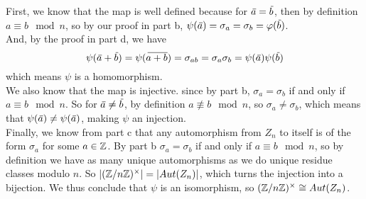 \documentclass[12pt]{article}
\begin{document}
\begin{enumerate}[label=\textbf{\alph*.}]
            First, we know that the map is well defined
            because for $\,\overline{\!{a}} = \,\overline{\!{b}}$,
            then by definition $a \equiv b \mod n$,
            so by our proof in part b,
            $\psi(\,\overline{\!{a}}) = \sigma_a = \sigma_b = \varphi(\,\overline{\!{b}})$. \\
            And, by the proof in part d, we have
            \[ \psi(\,\overline{\!{a}} + \,\overline{\!{b}})
            = \psi(\,\overline{\!{a + b}})
            = \sigma_{ab}
            = \sigma_{a}\sigma_{b} 
            = \psi(\,\overline{\!{a}})\psi(\,\overline{\!{b}}) \]
            which means $\psi$ is a homomorphism. \\
            We also know that the map is injective.
            since by part b, $\sigma_a = \sigma_b$
            if and only if $a \equiv b \mod n$.
            So for $\,\overline{\!{a}} \neq \,\overline{\!{b}}$,
            by definition $a \not\equiv b \mod n$,
            so $\sigma_a \neq \sigma_b$,
            which means that $\psi(\,\overline{\!{a}}) \neq \psi(\,\overline{\!{a}})$,
            making $\psi$ an injection. \\
            Finally, we know from part c that any automorphism
            from $Z_n$ to itself is of the form $\sigma_a$
            for some $a \in \mathbb{Z}$.
            By part b $\sigma_a = \sigma_b$
            if and only if $a \equiv b \mod n$,
            so by definition we have as many
            unique automorphisms as we do unique residue classes
            modulo $n$.
            So $|(\mathbb{Z}/n\mathbb{Z})^\times| = |Aut(Z_n)|$,
            which turns the injection into a bijection.
            We thus conclude that $\psi$ is an isomorphism,
            so $(\mathbb{Z}/n\mathbb{Z})^\times \cong Aut(Z_n)$.
    \end{enumerate}
\end{document}
